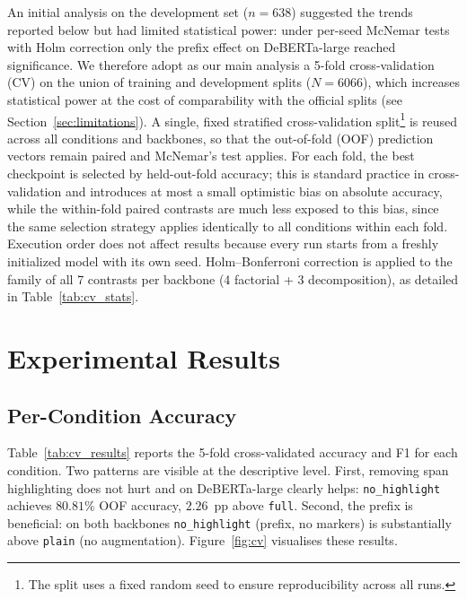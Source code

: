 \documentclass[runningheads]{llncs}
\begin{document}
An initial analysis on the development set ($n = 638$) suggested the trends
reported below but had limited statistical power: under per-seed McNemar tests
with Holm correction only the prefix effect on DeBERTa-large reached
significance. We therefore adopt as our main analysis a 5-fold cross-validation
(CV) on the union of training and development splits ($N = 6066$), which
increases statistical power at the cost of comparability with the official
splits (see Section~\ref{sec:limitations}). A
single, fixed stratified cross-validation split\footnote{The split uses a fixed
random seed to ensure reproducibility across all runs.} is reused across all
conditions and backbones, so that the out-of-fold (OOF) prediction vectors
remain paired and McNemar's test applies. For each fold, the best checkpoint is
selected by held-out-fold accuracy; this is standard practice in cross-validation
and introduces at most a small optimistic bias on absolute accuracy, while the
within-fold paired contrasts are much less exposed to this bias, since the same
selection strategy applies identically to all conditions within each fold.
Execution order does not affect results because every run starts from a freshly
initialized model with its own seed. Holm--Bonferroni correction is applied to
the family of all 7 contrasts per backbone (4 factorial + 3 decomposition), as
detailed in Table~\ref{tab:cv_stats}.

\section{Experimental Results}
\label{sec:results}

\subsection{Per-Condition Accuracy}
\label{subsec:per_condition}

Table~\ref{tab:cv_results} reports the 5-fold cross-validated accuracy and F1
for each condition. Two patterns are visible at the descriptive level. First,
removing span highlighting does not hurt and on DeBERTa-large clearly helps:
\texttt{no\_highlight} achieves $80.81\%$ OOF accuracy, $2.26$~pp above
\texttt{full}. Second, the prefix is beneficial: on both backbones
\texttt{no\_highlight} (prefix, no markers) is substantially above
\texttt{plain} (no augmentation). Figure~\ref{fig:cv} visualises these results.
\end{document}
